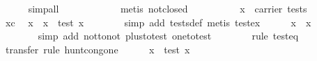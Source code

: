\begin{isabellebody}
\ \ \ \ \isamarkupfalse%
\ simp{}all\isanewline
\ \ \ \ \isamarkupfalse%
\ {}\isanewline
\ \ \ \ \isamarkupfalse%
\ {}metis\ not{}closed{}\isanewline
\ \ \isamarkupfalse%
\ {}\isanewline
\ \ \ \ \isamarkupfalse%
\ {}{}x\ {}\ carrier\ tests{}\isanewline
\ \ \ \ \isamarkupfalse%
\ xc\ \isamarkupfalse%
\ x{}\ \ {}x\ {}\ test\ x{}{}\isanewline
\ \ \ \ \ \ \isamarkupfalse%
\ {}simp\ add{}\ tests{}def{}\ metis\ test{}ex{}\isanewline
\ \ \ \ \isamarkupfalse%
\ {}x\ {}\ {}x\ {}\ {}{}\isanewline
\ \ \ \ \ \ \isamarkupfalse%
\ {}simp\ add{}\ not{}to{}not\ plus{}to{}test\ one{}to{}test{}\isanewline
\ \ \ \ \ \ \isamarkupfalse%
\ {}rule\ test{}eq{}\isanewline
\ \ \ \ \ \ \isamarkupfalse%
\ {}transfer{}\ rule\ hunt{}cong{}one{}\isanewline
\ \ \ \ \isamarkupfalse%
\ {}x\ {}\ test\ x{}{}\ \isamarkupfalse%

\end{isabellebody}
